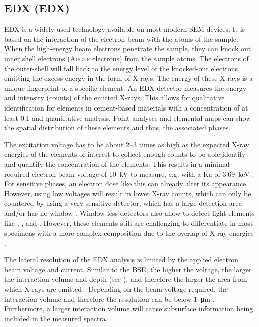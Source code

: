 
\subsection{\Acl*{EDX} (\acs*{EDX})}
\label{sec:edx}

\ac{EDX} is a widely used technology available on most modern \ac{SEM}-devices.
It is based on the interaction of the electron beam with the atoms of the sample.
When the high-energy beam electrons penetrate the sample, they can knock out inner shell electrons (\textsc{Auger} electrons) from the sample atoms.
The electrons of the outer-shell will fall back to the energy level of the knocked-out electrons, emitting the excess energy in the form of X-rays.
The energy of these X-rays is a unique fingerprint of a specific element.
An \ac{EDX} detector measures the energy and intensity (counts) of the emitted X-rays.
This allows for qualitative identification for elements in cement-based materials with a concentration of at least \qty{0.1}{\wtpercent} \cite{kleiner.2022b} and quantitative analysis. 
Point analyses and elemental maps can show the spatial distribution of these elements and thus, the associated phases.

The excitation voltage has to be about \numrange{2}{3} times as high as the expected X-ray energies of the elements of interest to collect enough counts to be able identify and quantify the concentration of the elements. %
This results in a minimal required electron beam voltage of \qty{10}{\kilo\volt} to measure, e.g.  with a \ac{Ka} of \qty{3.69}{\kilo\electronvolt} \cite{hudson.2003}.
For sensitive phases, an electron dose like this can already alter its appearance.
However, using low voltages will result in lower X-ray counts, which can only be countered by using a very sensitive detector, which has a large detection area and/or has no window \cite{yamamoto.2016}.
Window-less detectors \cite{tamura.2013} also allow to detect light elements like , , and  \cite{yamamoto.2016}.
However, these elements still are challenging to differentiate in most specimens with a more complex composition due to the overlap of X-ray energies \cite{hudson.2003}.

The lateral resolution of the \ac{EDX} analysis is limited by the applied electron beam voltage and current.
Similar to the \ac{BSE}, the higher the voltage, the larger the interaction volume and depth (see ), and therefore the larger the area from which X-rays are emitted \cite{rossen.2017}.
Depending on the beam voltage required, the interaction volume and therefore the resolution can be below \qty{1}{\micro\meter} \cite{jiang.2022}.
Furthermore, a larger interaction volume will cause subsurface information being included in the measured spectra.

